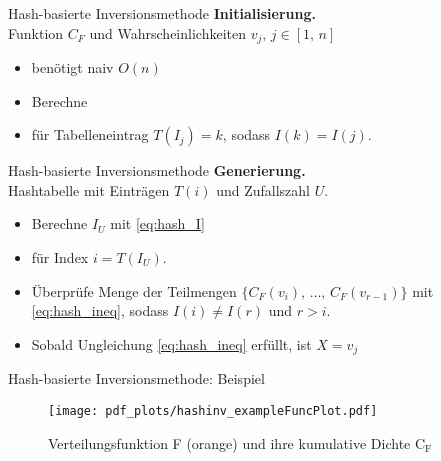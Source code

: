 \begin{frame}{Hash-basierte Inversionsmethode}
    \textbf{Initialisierung.}\\
    Funktion $C_F$ und Wahrscheinlichkeiten $v_j,\, j \in [1,\, n]$
    \begin{itemize}
        \item<2->  benötigt naiv $O(n)$
        \item<3-> Berechne 
        \item<4-> für Tabelleneintrag $T(I_j) = k$, sodass $I(k) = I(j)$.
    \end{itemize}
\end{frame}

\begin{frame}{Hash-basierte Inversionsmethode}
    \textbf{Generierung.}\\
    Hashtabelle mit Einträgen $T(i)$ und Zufallszahl $U$.
    \begin{itemize}
        \item<2-> Berechne $I_U$ mit \eqref{eq:hash_I}
        \item<3-> für Index $i = T(I_U)$.
        \item<4-> Überprüfe Menge der Teilmengen $\{C_F(v_i),\, \dots,\, C_F(v_{r-1})\}$ mit 
                \eqref{eq:hash_ineq}, sodass $I(i) \neq I(r)$ und $r > i$.
        \item<5-> Sobald Ungleichung \eqref{eq:hash_ineq} erfüllt, ist $X = v_j$
    \end{itemize}
\end{frame}

\begin{frame}{Hash-basierte Inversionsmethode: Beispiel}
    \begin{figure}
        \centering
        \texttt{[image: pdf\_plots/hashinv\_exampleFuncPlot.pdf]}
        \caption{Verteilungsfunktion F (orange) und ihre kumulative Dichte $\mathrm{C_F}$}
    \end{figure}
\end{frame}

